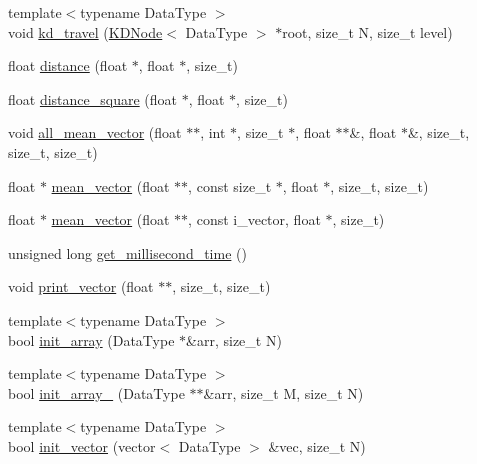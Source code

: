 \begin{DoxyCompactItemize}
\item 
{\footnotesize template$<$typename Data\-Type $>$ }\\void \hyperlink{namespaceSimpleCluster_addb0a17c2b98fa9a4847e598dac6971a}{kd\-\_\-travel} (\hyperlink{classSimpleCluster_1_1KDNode}{K\-D\-Node}$<$ Data\-Type $>$ $\ast$root, size\-\_\-t N, size\-\_\-t level)
\item 
float \hyperlink{namespaceSimpleCluster_a9f1d277b539531b128b4ab1d71a782b2}{distance} (float $\ast$, float $\ast$, size\-\_\-t)
\item 
float \hyperlink{namespaceSimpleCluster_af11168cf20d92f3baee0b301b2f8d95f}{distance\-\_\-square} (float $\ast$, float $\ast$, size\-\_\-t)
\item 
void \hyperlink{namespaceSimpleCluster_a1ebea3280f87e2bae60ecd1395520ee7}{all\-\_\-mean\-\_\-vector} (float $\ast$$\ast$, int $\ast$, size\-\_\-t $\ast$, float $\ast$$\ast$\&, float $\ast$\&, size\-\_\-t, size\-\_\-t, size\-\_\-t)
\item 
float $\ast$ \hyperlink{namespaceSimpleCluster_a7bacb031fff9fcae0608086fbeccecb1}{mean\-\_\-vector} (float $\ast$$\ast$, const size\-\_\-t $\ast$, float $\ast$, size\-\_\-t, size\-\_\-t)
\item 
float $\ast$ \hyperlink{namespaceSimpleCluster_aed0d5a893e782c920f5b1209d9ccc0a5}{mean\-\_\-vector} (float $\ast$$\ast$, const i\-\_\-vector, float $\ast$, size\-\_\-t)
\item 
unsigned long \hyperlink{namespaceSimpleCluster_a00c790e51730b0e775438fe6c5ccc2c6}{get\-\_\-millisecond\-\_\-time} ()
\item 
void \hyperlink{namespaceSimpleCluster_ad38a03476f0bbc79b454ce6a2c3368ab}{print\-\_\-vector} (float $\ast$$\ast$, size\-\_\-t, size\-\_\-t)
\item 
{\footnotesize template$<$typename Data\-Type $>$ }\\bool \hyperlink{namespaceSimpleCluster_acc1dff4c68ab24c3054d8b0953c8f92d}{init\-\_\-array} (Data\-Type $\ast$\&arr, size\-\_\-t N)
\item 
{\footnotesize template$<$typename Data\-Type $>$ }\\bool \hyperlink{namespaceSimpleCluster_a3e85bbadb909b189b987f27b841ca220}{init\-\_\-array\-\_} (Data\-Type $\ast$$\ast$\&arr, size\-\_\-t M, size\-\_\-t N)
\item 
{\footnotesize template$<$typename Data\-Type $>$ }\\bool \hyperlink{namespaceSimpleCluster_a28eb5aee7b654151728fe1333dc1a470}{init\-\_\-vector} (vector$<$ Data\-Type $>$ \&vec, size\-\_\-t N)

\end{DoxyCompactItemize}
